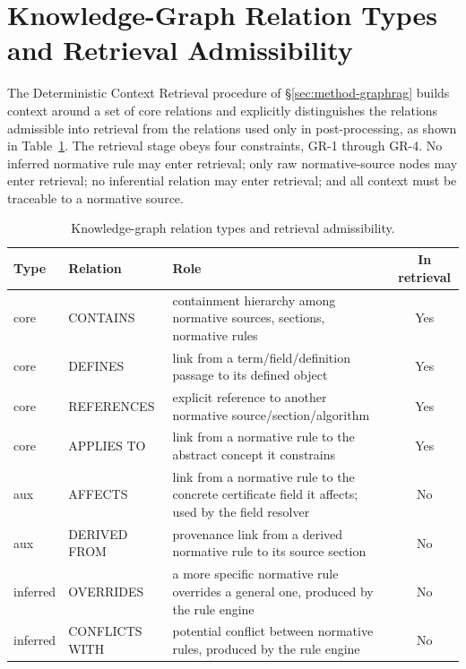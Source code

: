 
\section{Knowledge-Graph Relation Types and Retrieval Admissibility}
\label{app:kg}

The Deterministic Context Retrieval procedure of \S\ref{sec:method-graphrag} builds context around a set of
core relations and explicitly distinguishes the relations admissible into
retrieval from the relations used only in post-processing,
as shown in Table~\ref{tab:kgrel}. The retrieval stage
obeys four constraints, GR-1 through GR-4. No inferred normative rule may enter
retrieval; only raw normative-source nodes may enter retrieval; no inferential
relation may enter retrieval; and all context must be traceable to a
normative source.

\begin{table}[tb]
\centering
\footnotesize
\setlength{\tabcolsep}{4pt}
\caption{Knowledge-graph relation types and retrieval admissibility.}
\label{tab:kgrel}
\begin{tabularx}{\columnwidth}{@{}l l X c@{}}
\toprule
Type & Relation & Role & In retrieval \\
\midrule
core & CONTAINS & containment hierarchy among normative sources, sections, normative rules & Yes \\
core & DEFINES & link from a term/field/definition passage to its defined
  object & Yes \\
core & REFERENCES & explicit reference to another normative source/section/algorithm & Yes \\
core & APPLIES TO & link from a normative rule to the abstract concept it constrains
  & Yes \\
aux & AFFECTS & link from a normative rule to the concrete certificate field it affects;
  used by the field resolver & No \\
aux & DERIVED FROM & provenance link from a derived normative rule to its source section
  & No \\
inferred & OVERRIDES & a more specific normative rule overrides a general one, produced by
  the rule engine & No \\
inferred & CONFLICTS WITH & potential conflict between normative rules, produced by the
  rule engine & No \\
\bottomrule
\end{tabularx}
\end{table}


